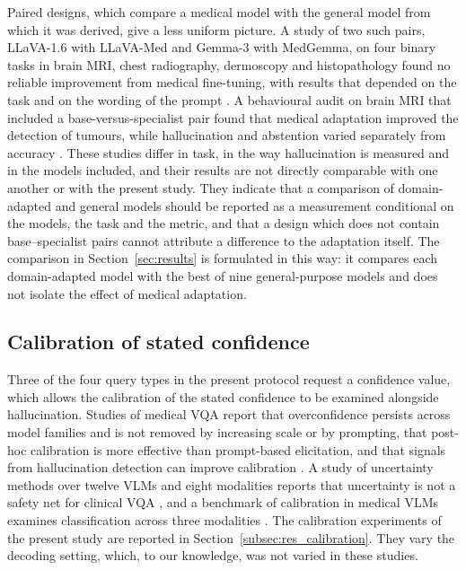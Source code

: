 \documentclass[11pt,a4paper]{article}
\begin{document}
Paired designs, which compare a medical model with the general model from which it was derived, give a less uniform picture. A study of two such pairs, LLaVA-1.6 with LLaVA-Med and Gemma-3 with MedGemma, on four binary tasks in brain MRI, chest radiography, dermoscopy and histopathology found no reliable improvement from medical fine-tuning, with results that depended on the task and on the wording of the prompt \citep{mclaughlin2026knowledge}. A behavioural audit on brain MRI that included a base-versus-specialist pair found that medical adaptation improved the detection of tumours, while hallucination and abstention varied separately from accuracy \citep{sabbaghziarani2026confident}. These studies differ in task, in the way hallucination is measured and in the models included, and their results are not directly comparable with one another or with the present study. They indicate that a comparison of domain-adapted and general models should be reported as a measurement conditional on the models, the task and the metric, and that a design which does not contain base--specialist pairs cannot attribute a difference to the adaptation itself. The comparison in Section~\ref{sec:results} is formulated in this way: it compares each domain-adapted model with the best of nine general-purpose models and does not isolate the effect of medical adaptation.

\subsection{Calibration of stated confidence}
\label{subsec:rw_calibration}

Three of the four query types in the present protocol request a confidence value, which allows the calibration of the stated confidence to be examined alongside hallucination. Studies of medical VQA report that overconfidence persists across model families and is not removed by increasing scale or by prompting, that post-hoc calibration is more effective than prompt-based elicitation, and that signals from hallucination detection can improve calibration \citep{byun2026overconfidence}. A study of uncertainty methods over twelve VLMs and eight modalities reports that uncertainty is not a safety net for clinical VQA \citep{fazla2026uncertainty}, and a benchmark of calibration in medical VLMs examines classification across three modalities \citep{sharifdeen2026mvcbench}. The calibration experiments of the present study are reported in Section~\ref{subsec:res_calibration}. They vary the decoding setting, which, to our knowledge, was not varied in these studies.
\end{document}
